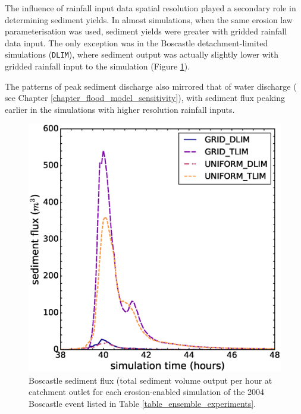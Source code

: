The influence of rainfall input data spatial resolution played a secondary role in determining sediment yields. In almost simulations, when the same erosion law parameterisation was used, sediment yields were greater with gridded rainfall data input. The only exception was in the Boscastle detachment-limited simulations (\texttt{DLIM}), where sediment output was actually slightly lower with gridded rainfall input to the simulation (Figure \ref{fig_boscastle_sedigraph_ensemble}).

The patterns of peak sediment discharge also mirrored that of water discharge ( see Chapter \ref{chapter_flood_model_sensitivity}), with sediment flux peaking earlier in the simulations with higher resolution rainfall inputs. 

\begin{figure}[t]
\includegraphics[width=14cm]{chp06_figures_scripts/figure_boscastle_sedigraph_ensemble.eps}
\caption{Boscastle sediment flux (total sediment volume output per hour at catchment outlet for each erosion-enabled simulation of the 2004 Boscastle event listed in Table \ref{table_ensemble_experiments}.}
\label{fig_boscastle_sedigraph_ensemble}
\end{figure}

